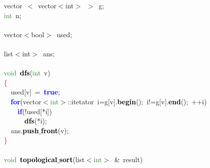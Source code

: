 {\ttfamily \raggedright {
\noindent
\mbox{}vector\ \textcolor{BrickRed}{$<$}\ \textcolor{TealBlue}{vector$<$int$>$\ $>$}\ g\textcolor{BrickRed}{;} \\
\mbox{}\textcolor{ForestGreen}{int}\ n\textcolor{BrickRed}{;} \\
\mbox{} \\
\mbox{}\textcolor{TealBlue}{vector$<$bool$>$}\ used\textcolor{BrickRed}{;} \\
\mbox{} \\
\mbox{}\textcolor{TealBlue}{list$<$int$>$}\ ans\textcolor{BrickRed}{;} \\
\mbox{} \\
\mbox{}\textcolor{ForestGreen}{void}\ \textbf{\textcolor{Black}{dfs}}\textcolor{BrickRed}{(}\textcolor{ForestGreen}{int}\ v\textcolor{BrickRed}{)} \\
\mbox{}\textcolor{Red}{\{} \\
\mbox{}\ \ used\textcolor{BrickRed}{[}v\textcolor{BrickRed}{]}\ \textcolor{BrickRed}{=}\ \textbf{\textcolor{Blue}{true}}\textcolor{BrickRed}{;} \\
\mbox{}\ \ \textbf{\textcolor{Blue}{for}}\textcolor{BrickRed}{(}vector\textcolor{BrickRed}{$<$}\textcolor{ForestGreen}{int}\textcolor{BrickRed}{$>$::}\textcolor{TealBlue}{itetator}\ i\textcolor{BrickRed}{=}g\textcolor{BrickRed}{[}v\textcolor{BrickRed}{].}\textbf{\textcolor{Black}{begin}}\textcolor{BrickRed}{();}\ i\textcolor{BrickRed}{!=}g\textcolor{BrickRed}{[}v\textcolor{BrickRed}{].}\textbf{\textcolor{Black}{end}}\textcolor{BrickRed}{();}\ \textcolor{BrickRed}{++}i\textcolor{BrickRed}{)} \\
\mbox{}\ \ \ \ \textbf{\textcolor{Blue}{if}}\textcolor{BrickRed}{(!}used\textcolor{BrickRed}{[*}i\textcolor{BrickRed}{])} \\
\mbox{}\ \ \ \ \ \ \textbf{\textcolor{Black}{dfs}}\textcolor{BrickRed}{(*}i\textcolor{BrickRed}{);} \\
\mbox{}\ \ ans\textcolor{BrickRed}{.}\textbf{\textcolor{Black}{push$\_$front}}\textcolor{BrickRed}{(}v\textcolor{BrickRed}{);} \\
\mbox{}\textcolor{Red}{\}} \\
\mbox{} \\
\mbox{}\textcolor{ForestGreen}{void}\ \textbf{\textcolor{Black}{topological$\_$sort}}\textcolor{BrickRed}{(}list\textcolor{BrickRed}{$<$}\textcolor{ForestGreen}{int}\textcolor{BrickRed}{$>$}\ \textcolor{BrickRed}{\&}\ result\textcolor{BrickRed}{)} \\
}}

